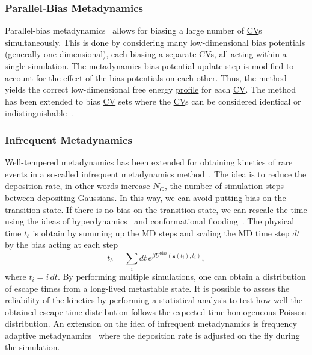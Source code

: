 \documentclass[9pt,review]{livecoms}
\newcommand{\vz}{\mathbf{z}}
\begin{document}
\subsubsection{Parallel-Bias Metadynamics}
\label{sec:pb-metad}
Parallel-bias metadynamics~\cite{Pfaendtner2015_pbmetad} allows for biasing a large number of \hyperlink{ref:CV} {CV}s simultaneously. This is done by considering many low-dimensional bias potentials (generally one-dimensional), each biasing a separate \hyperlink{ref:CV} {CV}s, all acting within a single simulation.  The metadynamics bias potential update step is modified to account for the effect of the bias potentials on each other. Thus, the method yields the correct low-dimensional free energy \hyperlink{ref:FES} {profile} for each \hyperlink{ref:CV} {CV}. The method has been extended to bias \hyperlink{ref:CV} {CV} sets where the \hyperlink{ref:CV} {CV}s can be considered identical or indistinguishable~\cite{Prakash2018_pbmetad-families}.


\subsubsection{Infrequent Metadynamics}
Well-tempered metadynamics has been extended for obtaining kinetics of rare events in a so-called infrequent metadynamics method~\cite{Tiwary-PRL-2013}. The idea is to reduce the deposition rate, in other words increase $N_{G}$, the number of simulation steps between depositing Gaussians. In this way, we can avoid putting bias on the transition state. If there is no bias on the transition state, we can rescale the time using the ideas of hyperdynamics~\cite{Voter-PRL-1997} and conformational flooding~\cite{Grubmuller-PRE-1995}. The physical time $t_b$ is obtain by summing up the MD steps and scaling the MD time step $dt$ by the bias acting at each step
\begin{equation}
\label{wtmetad_hyperdynamics}
t_b = \sum_{i} dt \, e^{\beta U^{\mathrm{bias}}(\vz(t_{i}),t_{i})},
\end{equation}
where $t_{i} = i\, dt$. By performing multiple simulations, one can obtain a distribution of escape times from a long-lived metastable state. It is possible to assess the reliability of the kinetics by performing a statistical analysis to test how well the obtained escape time distribution follows the expected time-homogeneous Poisson distribution. An extension on the idea of infrequent metadynamics is frequency adaptive metadynamics~\cite{Wang2018_FA-MetaD} where the deposition rate is adjusted on the fly during the simulation.
\end{document}

